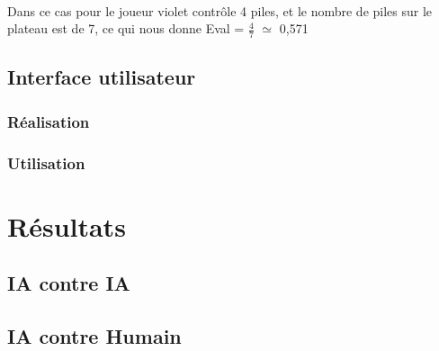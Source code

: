 \documentclass[article, backcover, french, nodocumentinfo]{upmethodology-document}
\begin{document}
				\paragraph{}
					Dans ce cas pour le joueur violet contrôle
					4 piles, et le nombre de piles sur le plateau
					est de 7, ce qui nous donne Eval = $\frac{4}{7}$
					$\simeq$ 0,571

		\subsection{Interface utilisateur}
			\subsubsection{Réalisation}
			\subsubsection{Utilisation}
	\section{Résultats}
		\subsection{IA contre IA}
		\subsection{IA contre Humain}
\end{document}
